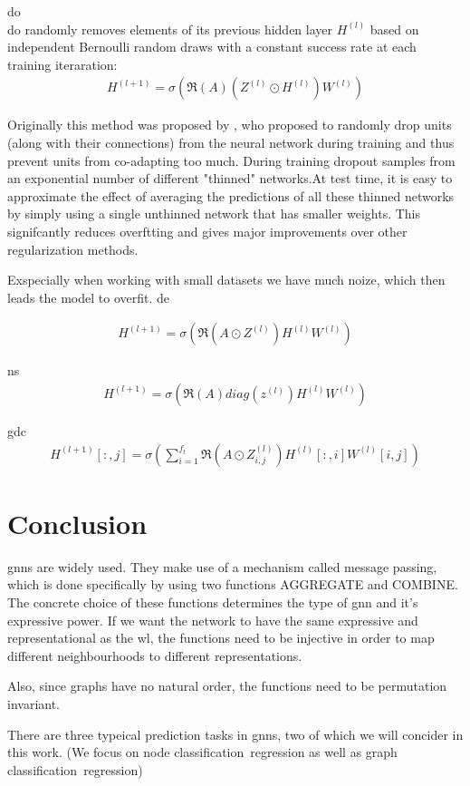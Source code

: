 
\ac{do}\\
\ac{do} randomly removes elements of its previous hidden
layer $H^{(l)}$ based on independent Bernoulli random draws
with a constant success rate at each training iteraration: \cite{DBLP:journals/corr/abs-2006-04064}
\begin{align*}
    H^{(l+1)} = \sigma(\mathfrak{R}(A)(Z^{(l)}\odot H^{(l)}) W^{(l)})
\end{align*}


Originally this method was proposed by \cite{Srivastava2014}, who proposed to
randomly drop units (along with their connections) from the neural
network during training and thus prevent units from co-adapting too much.
During training dropout samples from an exponential number of different "thinned" networks.At
test time, it is easy to approximate the effect of averaging the predictions of all these thinned networks
by simply using a single unthinned network that has smaller weights. This signifcantly
reduces overftting and gives major improvements over other regularization methods.


Exspecially when working with small datasets we have much noize, which then leads the model
to overfit.
\ac{de}

\begin{align*}
    H^{(l+1)} = \sigma(\mathfrak{R}(A \odot Z^{(l)}) H^{(l)} W^{(l)})
\end{align*}



\ac{ns}
\begin{align*}
    H^{(l+1)} = \sigma (\mathfrak{R}(A) diag(z^{(l)}) H^{(l)} W^{(l)})
\end{align*}



\ac{gdc}
\begin{align*}
    H^{(l+1)}[:,j] = \sigma (\sum_{i=1}^{f_{t}}\mathfrak{R}(A \odot Z_{i,j}^{(l)})H^{(l)}[:,i]W^{(l)}[i,j])
\end{align*}


\section{Conclusion}
\label{sec:related:conclusion}
\acp{gnn} are widely used. They make use of a mechanism called message passing, which
is done specifically by using two functions AGGREGATE and COMBINE.
The concrete choice of these functions determines the type of \ac{gnn}
and it's expressive power. If we want the network to have the same expressive
and representational as the \ac{wl}, the functions need to be injective in order
to map different neighbourhoods to different representations.

Also, since graphs have no natural order, the functions need to be permutation
invariant.


There are three typeical prediction tasks in \acp{gnn}, two of which we will concider
in this work. (We focus on node classification\ regression as well as
graph classification\ regression)
